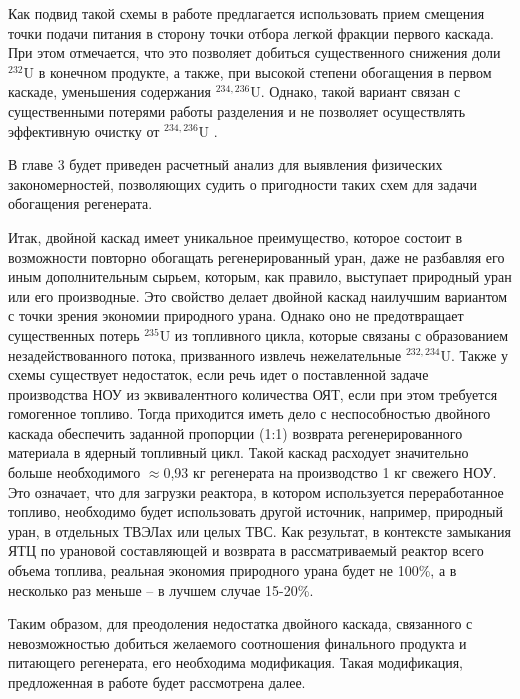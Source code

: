 Как подвид такой схемы в работе \cite{palkinReprocessedUraniumPurification2013} предлагается использовать прием смещения точки подачи питания в сторону точки отбора легкой фракции первого каскада.
При этом отмечается, что это позволяет добиться существенного снижения доли $^{232}$U в конечном продукте, а также, при высокой степени обогащения в первом каскаде, уменьшения содержания $^{234,236}$U.
Однако, такой вариант связан с существенными потерями работы разделения и не позволяет осуществлять эффективную очистку от $^{234,236}$U \cite{palkinPurificationReprocessedUranium2016}.

В главе 3 будет приведен расчетный анализ для выявления физических закономерностей, позволяющих судить о пригодности таких схем для задачи обогащения регенерата.

Итак, двойной каскад имеет уникальное преимущество, которое состоит в возможности повторно обогащать регенерированный уран, даже не разбавляя его иным дополнительным сырьем, которым, как правило, выступает природный уран или его производные.
Это свойство делает двойной каскад наилучшим вариантом с точки зрения экономии природного урана.
Однако оно не предотвращает существенных потерь $^{235}$U из топливного цикла, которые связаны с образованием незадействованного потока, призванного извлечь нежелательные $^{232,234}$U.
Также у схемы существует недостаток, если речь идет о поставленной задаче производства НОУ из эквивалентного количества ОЯТ, если при этом требуется гомогенное топливо.
Тогда приходится иметь дело с неспособностью двойного каскада обеспечить заданной пропорции (1:1) возврата регенерированного материала в ядерный топливный цикл.
Такой каскад расходует значительно больше необходимого $\approx$0,93 кг регенерата на производство 1 кг свежего НОУ.
Это означает, что для загрузки реактора, в котором используется переработанное топливо, необходимо будет использовать другой источник, например, природный уран, в отдельных ТВЭЛах или целых ТВС. 
Как результат, в контексте замыкания ЯТЦ по урановой составляющей и возврата в рассматриваемый реактор всего объема топлива, реальная экономия природного урана будет не 100\%, а в несколько раз меньше -- в лучшем случае 15-20\%.

Таким образом, для преодоления недостатка двойного каскада, связанного с невозможностью добиться желаемого соотношения финального продукта и питающего регенерата, его необходима модификация.
Такая модификация, предложенная в работе \cite{smirnovObogashchenieRegenerirovannogoUrana2018}
будет рассмотрена далее.

